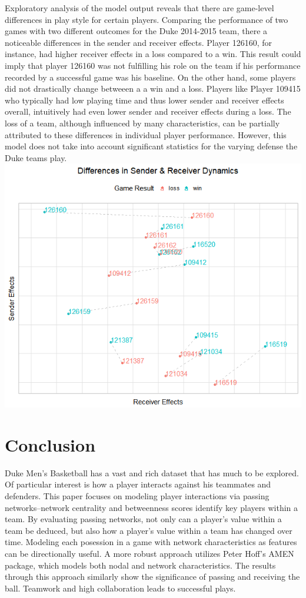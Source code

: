 \documentclass[12pt,twoside]{dukestatscithesis}
\theoremstyle{definition}
\theoremstyle{definition}
\theoremstyle{definition}
\theoremstyle{remark}
\begin{document}
Exploratory analysis of the model output reveals that there are
game-level differences in play style for certain players. Comparing the
performance of two games with two different outcomes for the Duke
2014-2015 team, there a noticeable differences in the sender and
receiver effects. Player 126160, for instance, had higher receiver
effects in a loss compared to a win. This result could imply that player
126160 was not fulfilling his role on the team if his performance
recorded by a successful game was his baseline. On the other hand, some
players did not drastically change betweeen a a win and a loss. Players
like Player 109415 who typically had low playing time and thus lower
sender and receiver effects overall, intuitively had even lower sender
and receiver effects during a loss. The loss of a team, although
influenced by many characteristics, can be partially attributed to these
differences in individual player performance. However, this model does
not take into account significant statistics for the varying defense the
Duke teams play.\\
\includegraphics{img/sendreceiver.png}

\chapter{Conclusion}\label{conclusion}

Duke Men's Basketball has a vast and rich dataset that has much to be
explored. Of particular interest is how a player interacts against his
teammates and defenders. This paper focuses on modeling player
interactions via passing networks--network centrality and betweenness
scores identify key players within a team. By evaluating passing
networks, not only can a player's value within a team be deduced, but
also how a player's value within a team has changed over time. Modeling
each posession in a game with network characteristics as features can be
directionally useful. A more robust approach utilizes Peter Hoff's AMEN
package, which models both nodal and network characteristics. The
results through this approach similarly show the significance of passing
and receiving the ball. Teamwork and high collaboration leads to
successful plays.
\end{document}
